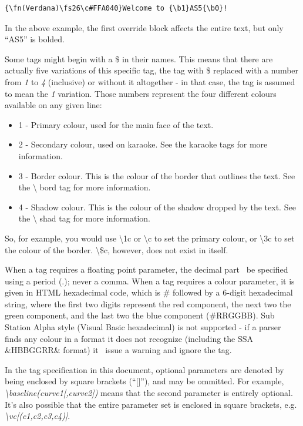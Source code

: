 \documentclass{spec}
\begin{document}
\begin{verbatim}
{\fn(Verdana)\fs26\c#FFA040}Welcome to {\b1}AS5{\b0}!
\end{verbatim}

In the above example, the first override block affects the entire text, but only ``AS5'' is bolded.

Some tags might begin with a \$ in their names. This means that there are actually five variations
of this specific tag, the tag with \$ replaced with a number from \emph{1} to \emph{4} (inclusive)
or without it altogether - in that case, the tag is assumed to mean the \emph{1} variation. Those
numbers represent the four different colours available on any given line:

\begin{itemize}
\item 1 - Primary colour, used for the main face of the text.
\item 2 - Secondary colour, used on karaoke. See the karaoke tags for more information.
\item 3 - Border colour. This is the colour of the border that outlines the text. See the \textbackslash
bord tag for more information.
\item 4 - Shadow colour. This is the colour of the shadow dropped by the text. See the \textbackslash
shad tag for more information.
\end{itemize}

So, for example, you would use \textbackslash 1c or \textbackslash c to set the primary colour, or
\textbackslash 3c to set the colour of the border. \textbackslash \$c, however, does not exist in
itself.

When a tag requires a floating point parameter, the decimal part \must\ be specified using a period (.);
never a comma. When a tag requires a colour parameter, it is given in HTML hexadecimal code, which is
\# followed by a 6-digit hexadecimal string, where the first two digits represent the red component,
the next two the green component, and the last two the blue component (\#RRGGBB). Sub Station Alpha
style (Visual Basic hexadecimal) is not supported - if a parser finds any colour in a format it does
not recognize (including the SSA \&HBBGGRR\& format) it \must\ issue a warning and ignore the tag.

In the tag specification in this document, optional parameters are denoted by being enclosed by square
brackets (``[]''), and may be ommitted. For example, \emph{\textbackslash baseline(curve1[,curve2])}
means that the second parameter is entirely optional. It's also possible that the entire parameter set
is enclosed in square brackets, e.g. \emph{\textbackslash vc[(c1,c2,c3,c4)]}.
\end{document}
